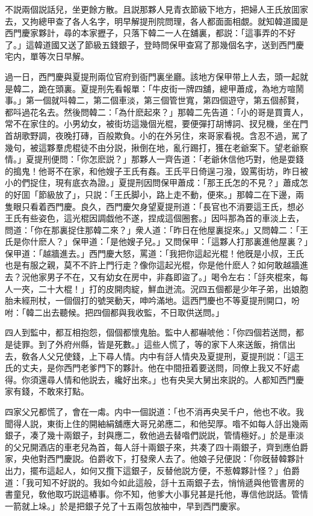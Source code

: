 不説兩個説話兒，坐更餘方散。且説那夥人見青衣節級下地方，把婦人王氏放囬家去，又拘總甲查了各人名字，明早解提刑院問理，各人都面面相覷。就知韓道國是西門慶家夥計，尋的本家攊子，只落下韓二一人在舖裏，都説：「這事弄的不好了。」這韓道國又送了節級五錢銀子，登時問保甲查寫了那幾個名字，送到西門慶宅内，單等次日早解。

過一日，西門慶與夏提刑兩位官府到衙門裏坐廳。該地方保甲带上人去，頭一起就是韓二，跪在頭裏。夏提刑先看報單：「牛皮街一牌四舖，總甲蕭成，為地方喧鬧事。」第一個就呌韓二，第二個車淡，第三個管世寬，第四個遊守，第五個郝賢，都呌過花名去。然後問韓二：「為什麽起來？」那韓二先告道：「小的哥是買賣人，常不在家住的。小男幼女，被街坊這幾個光棍，要便彈打胡博詞、扠兒機，坐在門首胡歌野調，夜晚打磚，百般欺負。小的在外另住，來哥家看視。含忍不過，駡了幾句，被這夥羣虎棍徒不由分説，揪倒在地，亂行踢打，獲在老爺案下。望老爺察情。」夏提刑便問：「你怎麽説？」那夥人一齊告道：「老爺休信他巧對，他是耍錢的搗鬼！他哥不在家，和他嫂子王氏有姦。王氏平日倚逞刁潑，毀罵街坊，昨日被小的們捉住，現有底衣為證。」夏提刑因問保甲蕭成：「那王氏怎的不見？」蕭成怎的好囬「節級放了」，只説：「王氏脚小，路上走不動，便來。」那韓二在下邊，兩隻眼只看着西門慶。良久，西門慶欠身望夏提刑道：「長官也不消要這王氏，想必王氏有些姿色，這光棍因調戯他不遂，捏成這個圈套。」因呌那為首的車淡上去，問道：「你在那裏捉住那韓二來？」衆人道：「昨日在他屋裏捉來。」又問韓二：「王氏是你什麽人？」保甲道：「是他嫂子兒。」又問保甲：「這夥人打那裏進他屋裏？」保甲道：「越牆進去。」西門慶大怒，罵道：「我把你這起光棍！他旣是小叔，王氏也是有服之親，莫不不許上門行走？像你這起光棍，你是他什麽人？如何敢越牆進去？況他家男子不在，又有幼女在房中，非姦即盜了。」喝令左右：「㧱夾棍來，每人一夾，二十大棍！」打的皮開肉綻，鮮血迸流。況四五個都是少年子弟，出娘胞胎未經刑杖，一個個打的號哭動天，呻吟滿地。這西門慶也不等夏提刑開口，吩咐：「韓二出去聽候。把四個都與我收監，不日取供送問。」

四人到監中，都互相抱怨，個個都懷鬼胎。監中人都嚇唬他：「你四個若送問，都是徒罪。到了外府州縣，皆是死數。」這些人慌了，等的家下人來送飯，捎信出去，敎各人父兄使錢，上下尋人情。内中有㧱人情央及夏提刑，夏提刑説：「這王氏的丈夫，是你西門老爹門下的夥計。他在中間扭着要送問，同僚上我又不好處得。你須還尋人情和他説去，纔好出來。」也有央吴大舅出來説的。人都知西門慶家有錢，不敢來打點。

四家父兄都慌了，會在一䖏。内中一個説道：「也不消再央吴千户，他也不收。我聞得人説，東街上住的開紬絹舖應大哥兄弟應二，和他契厚。喒不如每人㧱出幾兩銀子，凑了幾十兩銀子，封與應二，敎他過去替喒們説説，管情極好。」於是車淡的父兄開酒店的車老兒為首，每人㧱十兩銀子來，共凑了四十兩銀子，齊到應伯爵家，央他對西門慶説。伯爵收下，打發衆人去了。他娘子兒便説：「你旣替韓夥計出力，擺布這起人，如何又攬下這銀子，反替他説方便，不惹韓夥計怪？」伯爵道：「我可知不好説的。我如今如此這般，㧱十五兩銀子去，悄悄遞與他管書房的書童兒，敎他取巧説這樁事。你不知，他爹大小事兒甚是托他，專信他説話。管情一箭就上垛。」於是把銀子兑了十五兩包放袖中，早到西門慶家。

